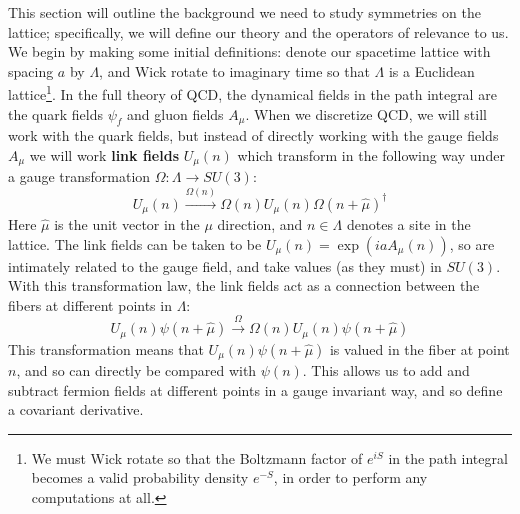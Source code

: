 \documentclass[11pt, oneside]{article}   	%
\theoremstyle{definition}
\begin{document}
This section will outline the background we need to study symmetries on the lattice; specifically, we will define our theory and 
the operators of relevance to us. We begin by making some initial definitions: denote our spacetime lattice with spacing $a$ by 
$\Lambda$, and Wick rotate to imaginary time so that $\Lambda$ is a Euclidean lattice\footnote{We must Wick rotate so that 
the Boltzmann factor of $e^{iS}$ in the path integral becomes a valid probability density $e^{-S}$, in order to perform any 
computations at all.}. In the full theory of QCD, the dynamical fields in the path integral are the quark fields $\psi_f$ and gluon 
fields $A_\mu$. When we discretize QCD, we will still work with the quark fields, but instead of directly working with the gauge 
fields $A_\mu$ we will work \textbf{link fields} $U_\mu(n)$ which transform in the following way under a gauge transformation 
$\Omega : \Lambda\rightarrow SU(3)$:
\begin{equation}
	U_\mu(n)\xrightarrow{\Omega(n)}\Omega(n) U_\mu(n)\Omega(n + \hat{\mu})^\dagger
\end{equation}
Here $\hat{\mu}$ is the unit vector in the $\mu$ direction, and $n\in\Lambda$ denotes a site in the lattice. The link fields can be 
taken to be $U_\mu(n) = \exp(ia A_\mu(n))$, so are intimately related to the gauge field, and take values (as they must) in 
$SU(3)$. With this transformation law, the link fields act as a connection between the fibers at different points in $\Lambda$:
\begin{equation}
	U_\mu(n)\psi(n + \hat{\mu})\xrightarrow{\Omega} \Omega(n) U_\mu(n)\psi(n + \hat{\mu})
\end{equation}
This transformation means that $U_\mu(n)\psi(n + \hat\mu)$ is valued in the fiber at point $n$, and so can directly be 
compared with $\psi(n)$. This allows us to add and subtract fermion fields at different points in a gauge invariant way, and so 
define a covariant derivative. 
\end{document}
